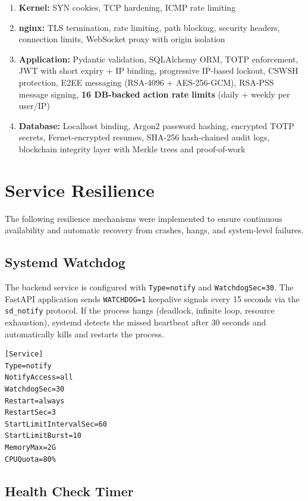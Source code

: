 \documentclass[12pt,a4paper]{article}
\begin{document}
\begin{enumerate}
  \item \textbf{Kernel:} SYN cookies, TCP hardening, ICMP rate limiting
  \item \textbf{nginx:} TLS termination, rate limiting, path blocking, security headers, connection limits, WebSocket proxy with origin isolation
  \item \textbf{Application:} Pydantic validation, SQLAlchemy ORM, TOTP enforcement, JWT with short expiry + IP binding, progressive IP-based lockout, CSWSH protection, E2EE messaging (RSA-4096 + AES-256-GCM), RSA-PSS message signing, \textbf{16 DB-backed action rate limits} (daily + weekly per user/IP)
  \item \textbf{Database:} Localhost binding, Argon2 password hashing, encrypted TOTP secrets, Fernet-encrypted resumes, SHA-256 hash-chained audit logs, blockchain integrity layer with Merkle trees and proof-of-work
\end{enumerate}

\section{Service Resilience}

The following resilience mechanisms were implemented to ensure continuous availability
and automatic recovery from crashes, hangs, and system-level failures.

\subsection{Systemd Watchdog}

The backend service is configured with \texttt{Type=notify} and \texttt{WatchdogSec=30}.
The FastAPI application sends \texttt{WATCHDOG=1} keepalive signals every 15 seconds
via the \texttt{sd\_notify} protocol. If the process hangs (deadlock, infinite loop,
resource exhaustion), systemd detects the missed heartbeat after 30 seconds and
automatically kills and restarts the process.

\begin{verbatim}
[Service]
Type=notify
NotifyAccess=all
WatchdogSec=30
Restart=always
RestartSec=3
StartLimitIntervalSec=60
StartLimitBurst=10
MemoryMax=2G
CPUQuota=80%
\end{verbatim}

\subsection{Health Check Timer}
\end{document}

